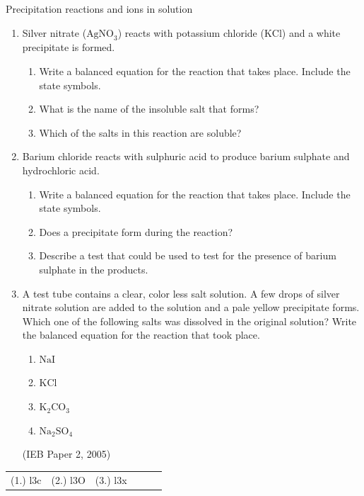 {{            \begin{exercises}{Precipitation reactions and ions in solution }
            \nopagebreak
            \label{m38719*id341939}\begin{enumerate}[noitemsep, label=\textbf{\arabic*}. ] 
            \label{m38719*uid74}\item Silver nitrate (${\text{AgNO}}_{3}$) reacts with potassium chloride ($\text{KCl}$) and a white precipitate is formed.
\label{m38719*id341969}\begin{enumerate}[noitemsep, label=\textbf{\alph*}. ] 
            \label{m38719*uid75}\item Write a balanced equation for the reaction that takes place. Include the state symbols. 
\label{m38719*uid76}\item What is the name of the insoluble salt that forms?
\label{m38719*uid77}\item Which of the salts in this reaction are soluble?
\end{enumerate}
\label{m38719*uid78}\item Barium chloride reacts with sulphuric acid to produce barium sulphate and hydrochloric acid.
\label{m38719*id342022}\begin{enumerate}[noitemsep, label=\textbf{\alph*}. ] 
            \label{m38719*uid79}\item Write a balanced equation for the reaction that takes place. Include the state symbols.
\label{m38719*uid80}\item Does a precipitate form during the reaction? 
\label{m38719*uid81}\item Describe a test that could be used to test for the presence of barium sulphate in the products.
\end{enumerate}
\label{m38719*uid82}\item A test tube contains a clear, color less salt solution. A few drops of silver nitrate solution are added to the solution and a pale yellow precipitate forms. Which one of the following salts was dissolved in the original solution? Write the balanced equation for the reaction that took place.
\label{m38719*id342078}\begin{enumerate}[noitemsep, label=\textbf{\alph*}. ] 
            \label{m38719*uid83}\item $\text{NaI}$
\label{m38719*uid84}\item $\text{KCl}$
\label{m38719*uid85}\item ${\text{K}}_{2}{\text{CO}}_{3}$\label{m38719*uid86}\item ${\text{Na}}_{2}{\text{SO}}_{4}$\end{enumerate}
(IEB Paper 2, 2005)\newline
\end{enumerate}
\practiceinfo
\par 
 \par \begin{tabular}[h]{cccccc}
 (1.) l3c  &  (2.) l3O  &  (3.) l3x  & \end{tabular}
\end{exercises}
}}
